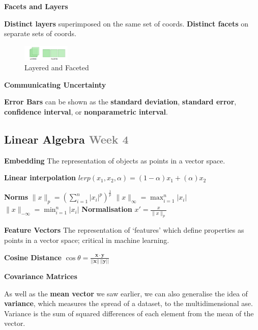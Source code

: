 \documentclass{article}
\begin{document}
\vspace{\baselineskip}

\textbf{Facets and Layers}

\textbf{Distinct layers} superimposed on the same set of coords.
\textbf{Distinct facets} on separate sets of coords.

\begin{figure}[h]
    \centering
    \includegraphics[width=0.2\textwidth]{assets/layered-faceted.png}
    \caption{Layered and Faceted}\label{fig:layered-faceted}
\end{figure}

\vspace{\baselineskip}

\textbf{Communicating Uncertainty}

\textbf{Error Bars} can be shown as the \textbf{standard deviation}, \textbf{standard error}, \textbf{confidence interval}, or \textbf{nonparametric interval}.

\clearpage

\subsection*{Linear Algebra \small\textcolor{gray}{Week 4}}

\textbf{Embedding} The representation of objects as points in a vector space.

\textbf{Linear interpolation}
$lerp(x_1, x_2, \alpha) = (1 - \alpha)x_1 + (\alpha)x_2$

\textbf{Norms}
$\|x\|_p = {(\sum_{i=1}^{n} |x_i|^p)}^{\frac{1}{p}}$
$\|x\|_\infty = \max_{i=1}^{n} |x_i|$
$\|x\|_{-\infty} = \min_{i=1}^{n} |x_i|$
\textbf{Normalisation} $x' = \frac{x}{\|x\|_p}$

\textbf{Feature Vectors} The representation of `features' which define properties as points
in a vector space; critical in machine learning.

\textbf{Cosine Distance}
$\cos \theta = \frac{\mathbf{x} \cdot \mathbf{y}}{||\mathbf{x}|| \, ||\mathbf{y}||}$

\textbf{Covariance Matrices}

As well as the \textbf{mean vector} we saw earlier, we can also generalise the idea of \textbf{variance},
which measures the spread of a dataset, to the multidimensional ase. Variance is the sum of squared differences
of each element from the mean of the vector.
\end{document}
